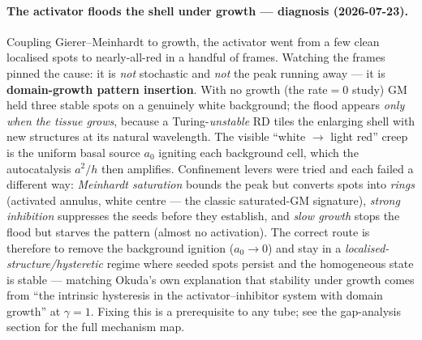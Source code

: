 \documentclass[11pt]{article}
\begin{document}
\paragraph{The activator floods the shell under growth --- diagnosis (2026-07-23).}
Coupling Gierer--Meinhardt to growth, the activator went from a few clean localised spots to
nearly-all-red in a handful of frames. Watching the frames pinned the cause: it is \emph{not} stochastic
and \emph{not} the peak running away --- it is \textbf{domain-growth pattern insertion}. With no growth
(the rate$=0$ study) GM held three stable spots on a genuinely white background; the flood appears
\emph{only when the tissue grows}, because a Turing-\emph{unstable} RD tiles the enlarging shell with new
structures at its natural wavelength. The visible ``white $\to$ light red'' creep is the uniform basal
source $a_0$ igniting each background cell, which the autocatalysis $a^2/h$ then amplifies. Confinement
levers were tried and each failed a different way: \emph{Meinhardt saturation} bounds the peak but
converts spots into \emph{rings} (activated annulus, white centre --- the classic saturated-GM signature),
\emph{strong inhibition} suppresses the seeds before they establish, and \emph{slow growth} stops the
flood but starves the pattern (almost no activation). The correct route is therefore to remove the
background ignition ($a_0\!\to\!0$) and stay in a \emph{localised-structure/hysteretic} regime where
seeded spots persist and the homogeneous state is stable --- matching Okuda's own explanation that
stability under growth comes from ``the intrinsic hysteresis in the activator--inhibitor system with
domain growth'' at $\gamma\!=\!1$. Fixing this is a prerequisite to any tube; see the gap-analysis
section for the full mechanism map.
\end{document}
